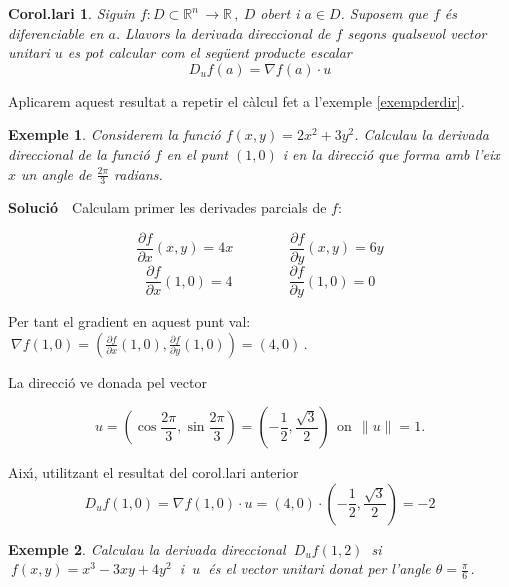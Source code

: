 \documentclass[12pt]{article}
\newcommand{\solucio}{\textbf{Soluci{\'o}}\ \ }
\newtheorem{corol}{Corol.lari}[subsection]
\newtheorem{exemple}{Exemple}[subsection]
\newcommand{\R}{\mathbb{R}}
\begin{document}

\vspace{0.4cm}
\begin{corol}\label{cor1}
Siguin $f:D\subset\R^n\, \longrightarrow\R\,,\ D$ obert i $a\in D$. Suposem que $f$ {\'e}s diferenciable en $a$. Llavors la derivada direccional de $f$
segons qualsevol vector unitari $u$  es pot calcular com el seg{\"u}ent producte escalar
\[
D_uf(a)  = \nabla f(a)\cdot u
\]
\end{corol}

Aplicarem aquest resultat a repetir el c{\`a}lcul fet a l'exemple \ref{exempderdir}.

\vspace{0.4cm}
\begin{exemple}
Considerem la funci{\'o} $f(x,y)=2x^2+3y^2$. Calculau la derivada direccional de la funci{\'o} $f$ en el punt $(1,0)$ i en la direcci{\'o} que forma amb l'eix $x$ un angle de $\frac{2\pi}{3}$ radians.
\end{exemple}

\solucio Calculam primer les derivades parcials de $f$:

$$
\frac{\partial f}{\partial x}(x,y)=4 x\qquad\qquad \frac{\partial f}{\partial y}(x,y)=6 y
$$
$$
\frac{\partial f}{\partial x}(1,0)=4 \qquad\qquad \frac{\partial f}{\partial y}(1,0)=0
$$

Per tant el gradient en aquest punt val: $\ \nabla f(1,0)=\left(\frac{\partial f}{\partial x}(1,0),\frac{\partial f}{\partial y}(1,0)\right)=(4,0)\,.$

La direcci{\'o} ve donada pel vector

\[
u=\left(\cos \frac{2\pi}{3},\sin \frac{2\pi}{3} \right)=\left(-\frac{1}{2},\frac{\sqrt{3}}{2}\right)\,\;
\mbox{on}\ \ \| u\| =1.
\]

Aix{\'\i}, utilitzant el resultat del corol.lari anterior
$$
D_uf(1,0)=\nabla f(1,0)\cdot u=(4,0)\cdot \left(-\frac{1}{2},\frac{\sqrt{3}}{2}\right)=-2
$$


\vspace{0.4cm}
\begin{exemple}
Calculau la derivada direccional $\ D_uf(1,2)\ $ si $\ f(x,y)=x^3 -3xy +
4y^2\ $ i $\ u\ $ {\'e}s el vector unitari donat per l'angle $\theta
=\frac{\pi}{6}\,.$
\end{exemple}
\end{document}
